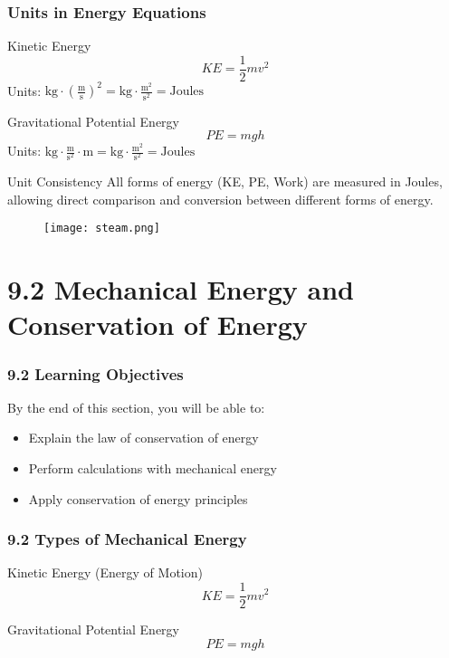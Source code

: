 \documentclass{beamer}
\begin{document}
\begin{frame}
\frametitle{Units in Energy Equations}
\begin{block}{Kinetic Energy}
$$KE = \frac{1}{2}mv^2$$
Units: $\text{kg} \cdot (\frac{\text{m}}{\text{s}})^2 = \text{kg}\cdot\frac{\text{m}^2}{\text{s}^2} = \text{Joules}$
\end{block}

\begin{block}{Gravitational Potential Energy}
$$PE = mgh$$
Units: $\text{kg} \cdot \frac{\text{m}}{\text{s}^2} \cdot \text{m} = \text{kg}\cdot\frac{\text{m}^2}{\text{s}^2} = \text{Joules}$
\end{block}

\begin{exampleblock}{Unit Consistency}
All forms of energy (KE, PE, Work) are measured in Joules, allowing direct comparison and conversion between different forms of energy.
\end{exampleblock}
\end{frame}

\begin{frame}
\begin{figure}
    \centering
    \texttt{[image: steam.png]}
\end{figure}
\end{frame}

\section{9.2 Mechanical Energy and Conservation of Energy}

\begin{frame}
\frametitle{9.2 Learning Objectives}
By the end of this section, you will be able to:
\begin{itemize}
\item Explain the law of conservation of energy
\item Perform calculations with mechanical energy
\item Apply conservation of energy principles
\end{itemize}
\end{frame}

\begin{frame}
\frametitle{9.2 Types of Mechanical Energy}
\begin{block}{Kinetic Energy (Energy of Motion)}
$$KE = \frac{1}{2}mv^2$$
\end{block}

\begin{block}{Gravitational Potential Energy}
$$PE = mgh$$
\end{block}
\end{frame}
\end{document}
